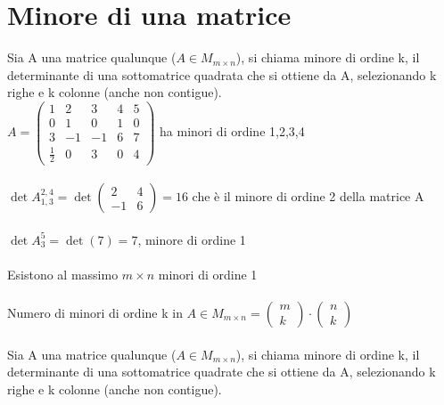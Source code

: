 \section{Minore di una matrice}
Sia A una matrice qualunque ($A\in M_{m\times n}$), si chiama minore di ordine k, il determinante di una sottomatrice quadrata che si ottiene da A, selezionando k righe e k colonne (anche non contigue).\\
$A=\begin{pmatrix}
	1 & 2 & 3 & 4 & 5\\
	0 & 1 & 0 & 1 & 0\\
	3 & -1 & -1 & 6 & 7\\
	\frac{1}{2} & 0 & 3 & 0 & 4
\end{pmatrix}$ ha minori di ordine 1,2,3,4\leavevmode\\\\
$\det A^{2,4}_{1,3}=\det\begin{pmatrix}
	2 & 4\\
	-1 & 6
\end{pmatrix}=16$ che è il minore di ordine 2 della matrice A\leavevmode\\\\
$\det A^{5}_{3}=\det(7)=7$, minore di ordine 1\leavevmode\\\\
Esistono al massimo $m\times n$ minori di ordine 1\leavevmode\\\\
Numero di minori di ordine k in $A\in M_{m\times n}=\begin{pmatrix}
	m\\
	k
\end{pmatrix}\cdot\begin{pmatrix}
	n\\
	k
\end{pmatrix}$
\leavevmode\\\\
Sia A una matrice qualunque ($A\in M_{m\times n}$), si chiama minore di ordine k, il determinante di una sottomatrice quadrate che si ottiene da A, selezionando k righe e k colonne (anche non contigue).\\